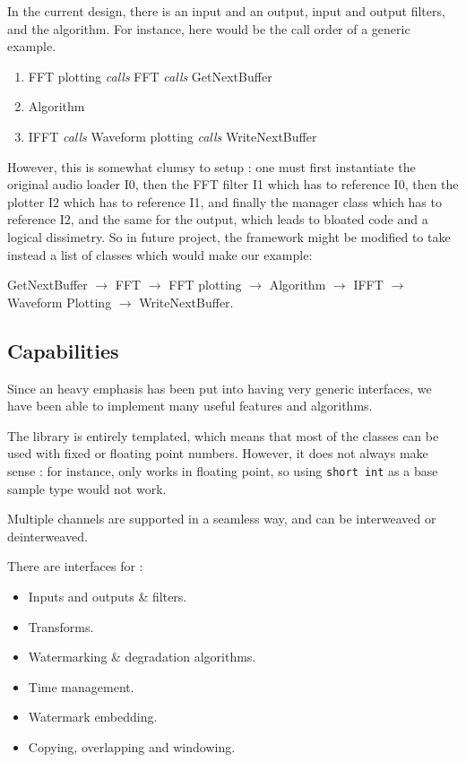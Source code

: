 In the current design, there is an input and an output, input and output filters, and the algorithm. For instance, here would be the call order of a generic example.

\begin{enumerate}
\item FFT plotting \textit{calls} FFT \textit{calls} GetNextBuffer
\item Algorithm
\item IFFT \textit{calls} Waveform plotting \textit{calls} WriteNextBuffer
\end{enumerate}

However, this is somewhat clumsy to setup : one must first instantiate the original audio loader I0, then the \ac{FFT} filter I1 which has to reference I0, then the plotter I2 which has to reference I1, and finally the manager class which has to reference I2, and the same for the output, which leads to bloated code and a logical dissimetry.
So in future project, the framework might be modified to take instead a list of classes which would make our example:

GetNextBuffer $\rightarrow$ FFT $\rightarrow$ FFT plotting $\rightarrow$ Algorithm $\rightarrow$ IFFT $\rightarrow$ Waveform Plotting $\rightarrow$ WriteNextBuffer.

\newpage

\subsection{Capabilities}
Since an heavy emphasis has been put into having very generic interfaces, we have been able to implement many useful features and algorithms.

The library is entirely templated, which means that most of the classes can be used with fixed or floating point numbers. However, it does not always make sense : for instance,  only works in floating point, so using \texttt{short int} as a base sample type would not work.

Multiple channels are supported in a seamless way, and can be interweaved or deinterweaved.

There are interfaces for : 
\begin{itemize}
\item Inputs and outputs \& filters.
\item Transforms.
\item Watermarking \& degradation algorithms.
\item Time management.
\item Watermark embedding.
\item Copying, overlapping and windowing.
\end{itemize}

